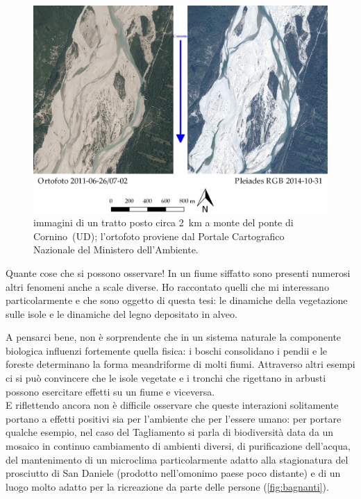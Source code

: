 \begin{figure}
	\centering
	\includegraphics[width=\textwidth]{files/confronto_immagini_erosione_isole.jpeg}
	\caption[immagini di un tratto posto circa \SI{2}{\kilo\m} a monte del ponte di Cornino]{immagini di un tratto posto circa \SI{2}{\kilo\m} a monte del ponte di Cornino~(UD); l'ortofoto proviene dal Portale Cartografico Nazionale del Ministero dell'Ambiente.
	}
	\label{fig:confronto-imm-prefaz}
\end{figure}


Quante cose che si possono osservare! In un fiume siffatto sono presenti numerosi altri fenomeni anche a scale diverse.
Ho raccontato quelli che mi interessano particolarmente e che sono oggetto di questa tesi: le dinamiche della vegetazione sulle isole e le dinamiche del legno depositato in alveo.

\medskip
A pensarci bene, non è sorprendente che in un sistema naturale la componente biologica influenzi fortemente quella fisica: i boschi consolidano i pendii e le foreste determinano la forma meandriforme di molti fiumi. Attraverso altri esempi ci si può convincere che le isole vegetate e i tronchi che rigettano in arbusti possono esercitare effetti su un fiume e viceversa. 
\\
E riflettendo ancora non è difficile osservare che queste interazioni solitamente portano a effetti positivi sia per l'ambiente che per l'essere umano: per portare qualche esempio, nel caso del Tagliamento si parla di biodiversità data da un mosaico in continuo cambiamento di ambienti diversi, di purificazione dell'acqua, del mantenimento di un microclima particolarmente adatto alla stagionatura del prosciutto di San Daniele (prodotto nell'omonimo paese poco distante) e di un luogo molto adatto per la ricreazione da parte delle persone (\vref{fig:bagnanti}).

